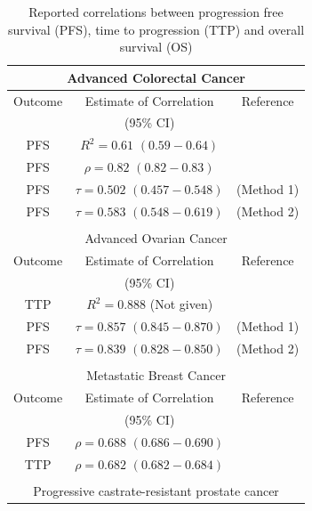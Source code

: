 \begin{table}[hb] 
\caption{Reported correlations between progression free survival (PFS), time to progression (TTP) and overall survival (OS)}
\centering 
\begin{tabular}{|c|c|c|}

\multicolumn{3}{c}{Advanced Colorectal Cancer} \\
\hline
Outcome     & Estimate of Correlation    & Reference \\ 
            &  (95\% CI)    &           \\
\hline
PFS  & $R^2 = 0.61$ $(0.59 - 0.64)$  & \cite{Green2008}         \\ 
\hline
PFS  & $\rho = 0.82$ $(0.82 - 0.83)$  &  \cite{Buyse2007}       \\ 
\hline
PFS  & $\tau = 0.502$ $(0.457 - 0.548)$ &  \cite{Burzykowski2001}  (Method 1)   \\
\hline
PFS  & $\tau = 0.583$ $(0.548 - 0.619)$ &  \cite{Burzykowski2001} (Method 2) \\    
\hline    
\multicolumn{3}{c}{ } \\
\multicolumn{3}{c}{Advanced Ovarian Cancer}   \\
\hline
Outcome     & Estimate of Correlation    & Reference \\ 
            &  (95\% CI)    &           \\
\hline
 TTP  & $R^2 = 0.888$ (Not given) & \cite{Buyse2000}  \\    
\hline
PFS & $\tau = 0.857$ $(0.845 - 0.870)$ & \cite{Burzykowski2001} (Method 1)  \\    
\hline                        
PFS & $\tau = 0.839$ $(0.828 - 0.850)$ &  \cite{Burzykowski2001} (Method 2)\\        
\hline    
\multicolumn{3}{c}{ } \\
\multicolumn{3}{c}{Metastatic Breast Cancer}   \\
\hline
Outcome     & Estimate of Correlation    & Reference \\ 
            &  (95\% CI)    &           \\
\hline
PFS  & $\rho = 0.688$ $(0.686 - 0.690)$ & \cite{Burzykowski2008}   \\   
\hline     
TTP  & $\rho = 0.682$ $(0.682 - 0.684)$   & \cite{Burzykowski2008}   \\ 
\hline
\multicolumn{3}{c}{ } \\
\multicolumn{3}{c}{Progressive castrate-resistant prostate cancer }   \\

\end{tabular}
\end{table}
